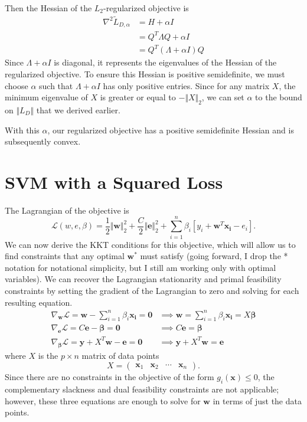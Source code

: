 \documentclass{article}
\begin{document}
		Then the Hessian of the $L_2$-regularized objective is
		\begin{align*}
			\nabla^2 \tilde{L}_{D,\alpha} &= H + \alpha I \\
						      &= Q^T \Lambda Q + \alpha I \\
						      &= Q^T (\Lambda + \alpha I) Q
		\end{align*}
		Since $\Lambda+\alpha I$ is diagonal, it represents the eigenvalues of the Hessian of the regularized objective. To ensure this Hessian is positive semidefinite, we must choose $\alpha$ such that $\Lambda + \alpha I$ has only positive entries. Since for any matrix $X$, the minimum eigenvalue of $X$ is greater or equal to $-\Vert{X}\Vert_2$, we can set $\alpha$ to the bound on $\Vert{L_D}\Vert$ that we derived earlier.

		With this $\alpha$, our regularized objective has a positive semidefinite Hessian and is subsequently convex.


\section{SVM with a Squared Loss}

		The Lagrangian of the objective is
		\[
			\mathcal{L}(w,e,\beta) = \frac{1}{2} \Vert{\mathbf{w}}\Vert_2^2 + \frac{C}{2} \Vert{\mathbf{e}}\Vert_2^2 + \sum_{i=1}^{n} \beta_i [y_i + \mathbf{w}^T \mathbf{x_i} - e_i].
		\] 
		We can now derive the KKT conditions for this objective, which will allow us to find constraints that any optimal $\mathbf{w}^*$ must satisfy (going forward, I drop the * notation for notational simplicity, but I still am working only with optimal variables). We can recover the Lagrangian stationarity and primal feasibility constraints by setting the gradient of the Lagrangian to zero and solving for each resulting equation.
		\begin{align*}
			\nabla_\mathbf{w} \mathcal{L} = \mathbf{w} - \sum_{i=1}^{n} \beta_i \mathbf{x_i} = \mathbf{0} &\implies \mathbf{w} = \sum_{i=1}^{n} \beta_i \mathbf{x_i} = X \boldsymbol\beta \\
			\nabla_\mathbf{e} \mathcal{L} = C\mathbf{e} - \boldsymbol\beta = \mathbf{0} &\implies C\mathbf{e}=\boldsymbol\beta \\
			\nabla_{\boldsymbol\beta} \mathcal{L} = \mathbf{y} + X^T \mathbf{w} - \mathbf{e} = \mathbf{0} &\implies \mathbf{y} + X^T \mathbf{w} = \mathbf{e}
		\end{align*}
		where $X$ is the $p \times n$ matrix of data points
		\[
		X =
		\begin{pmatrix}
			\mathbf{x}_1 & \mathbf{x}_2 & \cdots & \mathbf{x}_n
		\end{pmatrix}.
		\] 
		Since there are no constraints in the objective of the form $g_i(\mathbf{x}) \leq 0$, the complementary slackness and dual feasibility constraints are not applicable; however, these three equations are enough to solve for $\mathbf{w}$ in terms of just the data points.
\end{document}
